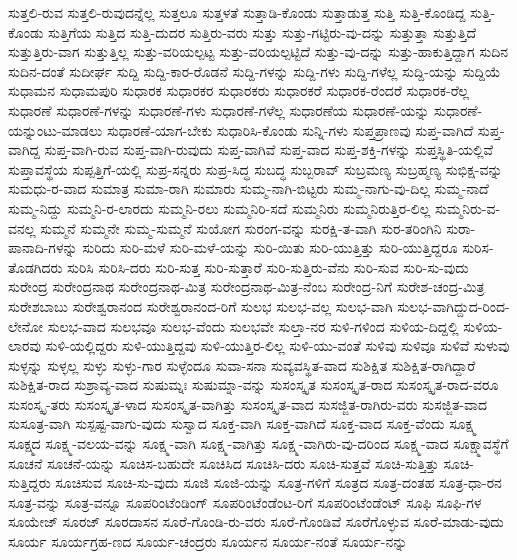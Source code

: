 {ಸುತ್ತಲಿ-ರುವ
ಸುತ್ತಲಿ-ರುವುದನ್ನೆಲ್ಲ
ಸುತ್ತಲೂ
ಸುತ್ತಳತೆ
ಸುತ್ತಾಡಿ-ಕೊಂಡು
ಸುತ್ತಾಡುತ್ತ
ಸುತ್ತಿ
ಸುತ್ತಿ-ಕೊಂಡಿದ್ದ
ಸುತ್ತಿ-ಕೊಂಡು
ಸುತ್ತಿಗೆಯ
ಸುತ್ತಿದ
ಸುತ್ತಿ-ದುದರ
ಸುತ್ತಿರು-ವರು
ಸುತ್ತು
ಸುತ್ತು-ಗಟ್ಟಿರು-ವು-ದನ್ನು
ಸುತ್ತುತ್ತಾ
ಸುತ್ತುತ್ತಿದೆ
ಸುತ್ತುತ್ತಿರು-ವಾಗ
ಸುತ್ತುತ್ತಿಲ್ಲ
ಸುತ್ತು-ವರಿಯಲ್ಪಟ್ಟ
ಸುತ್ತು-ವರಿಯಲ್ಪಟ್ಟಿದೆ
ಸುತ್ತು-ವು-ದನ್ನು
ಸುತ್ತು-ಹಾಕುತ್ತಿದ್ದಾಗ
ಸುದಿನ
ಸುದಿನ-ದಂತೆ
ಸುದೀರ್ಘ
ಸುದ್ದಿ
ಸುದ್ದಿ-ಕಾರ-ರೊಡನೆ
ಸುದ್ದಿ-ಗಳನ್ನು
ಸುದ್ದಿ-ಗಳು
ಸುದ್ದಿ-ಗಳೆಲ್ಲ
ಸುದ್ದಿ-ಯನ್ನು
ಸುದ್ದಿಯೆ
ಸುಧಾಮನ
ಸುಧಾಮಪುರಿ
ಸುಧಾರಕ
ಸುಧಾರಕರ
ಸುಧಾರಕರು
ಸುಧಾರಕರೆ
ಸುಧಾರಕ-ರೆಂದರೆ
ಸುಧಾರಕ-ರೆಲ್ಲ
ಸುಧಾರಣೆ
ಸುಧಾರಣೆ-ಗಳನ್ನು
ಸುಧಾರಣೆ-ಗಳು
ಸುಧಾರಣೆ-ಗಳೆಲ್ಲ
ಸುಧಾರಣೆಯ
ಸುಧಾರಣೆ-ಯನ್ನು
ಸುಧಾರಣೆ-ಯನ್ನುಂಟು-ಮಾಡಲು
ಸುಧಾರಣೆ-ಯಾಗ-ಬೇಕು
ಸುಧಾರಿಸಿ-ಕೊಂಡು
ಸುನ್ನಿ-ಗಳು
ಸುಪ್ತಪ್ರಾಣವು
ಸುಪ್ತ-ವಾಗಿದೆ
ಸುಪ್ತ-ವಾಗಿದ್ದ
ಸುಪ್ತ-ವಾಗಿ-ರುವ
ಸುಪ್ತ-ವಾಗಿ-ರುವುದು
ಸುಪ್ತ-ವಾಗಿವೆ
ಸುಪ್ತ-ವಾದ
ಸುಪ್ತ-ಶಕ್ತಿ-ಗಳನ್ನು
ಸುಪ್ತಸ್ಥಿತಿ-ಯಲ್ಲಿವೆ
ಸುಪ್ತಾವಸ್ಥೆಯ
ಸುಪ್ಪತ್ತಿಗೆ-ಯಲ್ಲಿ
ಸುಪ್ರ-ಸನ್ನರು
ಸುಪ್ರ-ಸಿದ್ಧ
ಸುಬದ್ಧ
ಸುಬ್ಬರಾವ್
ಸುಬ್ರಮಣ್ಯ
ಸುಬ್ರಹ್ಮಣ್ಯ
ಸುಭಿಕ್ಷ-ವನ್ನು
ಸುಮಧು-ರ-ವಾದ
ಸುಮಾತ್ರ
ಸುಮಾ-ರಾಗಿ
ಸುಮಾರು
ಸುಮ್ಮ-ನಾಗಿ-ಬಿಟ್ಟರು
ಸುಮ್ಮ-ನಾಗು-ವು-ದಿಲ್ಲ
ಸುಮ್ಮ-ನಾದೆ
ಸುಮ್ಮ-ನಿದ್ದು
ಸುಮ್ಮನಿ-ರ-ಲಾರದು
ಸುಮ್ಮನಿ-ರಲು
ಸುಮ್ಮನಿರಿ-ಸದೆ
ಸುಮ್ಮನಿರು
ಸುಮ್ಮನಿರುತ್ತಿರ-ಲಿಲ್ಲ
ಸುಮ್ಮನಿರು-ವ-ವನಲ್ಲ
ಸುಮ್ಮನೆ
ಸುಮ್ಮನೇ
ಸುಮ್ಮ-ಸುಮ್ಮನೆ
ಸುಯೋಗ
ಸುರಂಗ-ವನ್ನು
ಸುರಕ್ಷಿ-ತ-ವಾಗಿ
ಸುರ-ತರಿಂಗಿನಿ
ಸುರಾ-ಪಾನಾದಿ-ಗಳನ್ನು
ಸುರಿದು
ಸುರಿ-ಮಳೆ
ಸುರಿ-ಮಳೆ-ಯನ್ನು
ಸುರಿ-ಯಿತು
ಸುರಿ-ಯುತ್ತಿತ್ತು
ಸುರಿ-ಯುತ್ತಿದ್ದರೂ
ಸುರಿಸ-ತೊಡಗಿದರು
ಸುರಿಸಿ
ಸುರಿಸಿ-ದರು
ಸುರಿ-ಸುತ್ತ
ಸುರಿ-ಸುತ್ತಾರೆ
ಸುರಿ-ಸುತ್ತಿರು-ವೆನು
ಸುರಿ-ಸುವ
ಸುರಿ-ಸು-ವುದು
ಸುರೇಂದ್ರ
ಸುರೇಂದ್ರನಾಥ
ಸುರೇಂದ್ರನಾಥ-ಮಿತ್ರ
ಸುರೇಂದ್ರನಾಥ-ಮಿತ್ರ-ನೆಂಬ
ಸುರೇಂದ್ರ-ನಿಗೆ
ಸುರೇಶ-ಚಂದ್ರ-ಮಿತ್ರ
ಸುರೇಶಬಾಬು
ಸುರೇಶ್ವರಾನಂದ
ಸುರೇಶ್ವರಾನಂದ-ರಿಗೆ
ಸುಲಭ
ಸುಲಭ-ವಲ್ಲ
ಸುಲಭ-ವಾಗಿ
ಸುಲಭ-ವಾಗಿದ್ದುದ-ರಿಂದ-ಲೇನೋ
ಸುಲಭ-ವಾದ
ಸುಲಭವೂ
ಸುಲಭ-ವೆಂದು
ಸುಲಭವೇ
ಸುಲ್ತಾ-ನರ
ಸುಳಿ-ಗಳಿಂದ
ಸುಳಿಯ-ದಿದ್ದಲ್ಲಿ
ಸುಳಿಯ-ಲಾರವು
ಸುಳಿ-ಯಲ್ಲಿದ್ದರು
ಸುಳಿ-ಯುತ್ತಿದ್ದವು
ಸುಳಿ-ಯುತ್ತಿರ-ಲಿಲ್ಲ
ಸುಳಿ-ಯು-ವಂತೆ
ಸುಳಿವು
ಸುಳಿವೂ
ಸುಳಿವೆ
ಸುಳುವು
ಸುಳ್ಳನ್ನು
ಸುಳ್ಳಲ್ಲ
ಸುಳ್ಳು
ಸುಳ್ಳು-ಗಾರ
ಸುಳ್ಳೆಂದೂ
ಸುವಾ-ಸನಾ
ಸುವ್ಯವಸ್ಥಿತ-ವಾದ
ಸುಶಿಕ್ಷಿತ
ಸುಶಿಕ್ಷಿತ-ರಾಗಿದ್ದಾರೆ
ಸುಶಿಕ್ಷಿತ-ರಾದ
ಸುಶ್ರಾವ್ಯ-ವಾದ
ಸುಷುಮ್ನಃ
ಸುಷುಮ್ನಾ-ವನ್ನು
ಸುಸಂಸ್ಕೃತ
ಸುಸಂಸ್ಕೃತ-ರಾದ
ಸುಸಂಸ್ಕೃತ-ರಾದ-ವರೂ
ಸುಸಂಸ್ಕೃ-ತರು
ಸುಸಂಸ್ಕೃತ-ಳಾದ
ಸುಸಂಸ್ಕೃತ-ವಾಗಿತ್ತು
ಸುಸಂಸ್ಕೃತ-ವಾದ
ಸುಸಜ್ಜಿತ-ರಾಗಿರು-ವರು
ಸುಸಜ್ಜಿತ-ವಾದ
ಸುಸೂತ್ರ-ವಾಗಿ
ಸುಸ್ಪಷ್ಟ-ವಾಗು-ವುದು
ಸುಸ್ವಾದ
ಸೂಕ್ತ-ವಾಗಿ
ಸೂಕ್ತ-ವಾಗಿದೆ
ಸೂಕ್ತ-ವಾದ
ಸೂಕ್ತ-ವೆಂದು
ಸೂಕ್ಷ್ಮ
ಸೂಕ್ಷ್ಮದ
ಸೂಕ್ಷ್ಮ-ವಲಯ-ವನ್ನು
ಸೂಕ್ಷ್ಮ-ವಾಗಿ
ಸೂಕ್ಷ್ಮ-ವಾಗಿತ್ತು
ಸೂಕ್ಷ್ಮ-ವಾಗಿರು-ವು-ದರಿಂದ
ಸೂಕ್ಷ್ಮ-ವಾದ
ಸೂಕ್ಷ್ಮಾವಸ್ಥೆಗೆ
ಸೂಚನೆ
ಸೂಚನೆ-ಯನ್ನು
ಸೂಚಿಸ-ಬಹುದೇ
ಸೂಚಿಸಿದ
ಸೂಚಿಸಿ-ದರು
ಸೂಚಿ-ಸುತ್ತವೆ
ಸೂಚಿ-ಸುತ್ತಿತ್ತು
ಸೂಚಿ-ಸುತ್ತಿದ್ದರು
ಸೂಚಿಸುವ
ಸೂಚಿ-ಸು-ವುದು
ಸೂಜಿ
ಸೂಜಿ-ಯನ್ನು
ಸೂತ್ರ-ಗಳಿಗೆ
ಸೂತ್ರದ
ಸೂತ್ರ-ದಂತಹ
ಸೂತ್ರ-ಧಾ-ರನ
ಸೂತ್ರ-ವನ್ನು
ಸೂತ್ರ-ವನ್ನೂ
ಸೂಪರಿಂಟೆಂಡಿಂಗ್
ಸೂಪರಿಂಟೆಂಡೆಂಟ-ರಿಗೆ
ಸೂಪರಿಂಟೆಂಡೆಂಟ್
ಸೂಫಿ
ಸೂಫಿ-ಗಳ
ಸೂಯೇಜ್
ಸೂರಜ್
ಸೂರದಾಸನ
ಸೂರೆ-ಗೊಂಡಿ-ರು-ವರು
ಸೂರೆ-ಗೊಂಡಿವೆ
ಸೂರೆಗೊಳ್ಳುವ
ಸೂರೆ-ಮಾಡು-ವುದು
ಸೂರ್ಯ
ಸೂರ್ಯಗ್ರಹ-ಣದ
ಸೂರ್ಯ-ಚಂದ್ರರು
ಸೂರ್ಯನ
ಸೂರ್ಯ-ನಂತೆ
ಸೂರ್ಯ-ನನ್ನು
}
